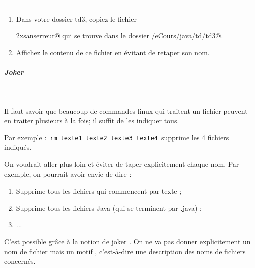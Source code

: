 \documentclass[11pt,a4paper]{article}
\begin{document}
					\textcolor{white}{.} \par
				
            \par
        
					\begin{enumerate}
				
			\item 
            Dans votre dossier td3, copiez le fichier \par
				\verb@monfichieraunomtellementlongquilmeparaitpeuprobabledeletaper2xsanserreur@
            qui se trouve dans le dossier \verb@/eCours/java/td/td3@.
          
			\item Affichez le contenu de ce fichier en \'evitant de retaper son nom.
					\end{enumerate}
				
			
		\subparagraph{Joker} 
		
					\textcolor{white}{.} \par
				
            \par
        
          Il faut savoir que beaucoup de commandes linux qui traitent un fichier peuvent en traiter plusieurs \`a la fois; il suffit de les indiquer tous.
        
            \par
        
          Par exemple : \,\verb|rm texte1 texte2 texte3 texte4|\, supprime les 4 fichiers indiqu\'es.
        
            \par
        
          On voudrait aller plus loin et \'eviter de taper explicitement chaque nom. Par exemple, on pourrait avoir envie de dire :
          
					\begin{enumerate}
				
			\item Supprime tous les fichiers qui commencent par \guillemotleft  texte \guillemotright  ;
			\item Supprime tous les fichiers Java (qui se terminent par .java) ;
			\item ...
					\end{enumerate}
				
          C'est possible gr\^ace \`a la notion de \guillemotleft  joker \guillemotright . 
          On ne va pas donner explicitement un nom de fichier mais un \guillemotleft  motif \guillemotright , c'est-\`a-dire une description des noms de fichiers concern\'es.
        
\end{document}
